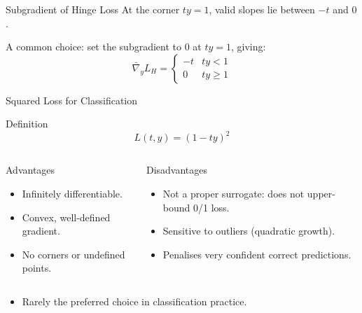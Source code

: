 \begin{frame}{Subgradient of Hinge Loss}
  At the corner $ty=1$, valid slopes lie between $-t$ and $0$.
  \vspace{8pt}
  \begin{center}
  \end{center}
  A common choice: set the subgradient to $0$ at $ty=1$, giving:
  \[
    \bar\nabla_y L_H = \begin{cases} -t & ty<1\\ 0 & ty\geq 1 \end{cases}
  \]
\end{frame}

\begin{frame}{Squared Loss for Classification}
  \begin{block}{Definition}
    \[ L(t,y) = (1-ty)^2 \]
  \end{block}
  \begin{columns}[t]
      \begin{block}{Advantages}
        \begin{itemize}
          \item Infinitely differentiable.
          \item Convex, well-defined gradient.
          \item No corners or undefined points.
        \end{itemize}
      \end{block}
      \begin{alertblock}{Disadvantages}
        \begin{itemize}
          \item Not a proper surrogate: does not upper-bound 0/1 loss.
          \item Sensitive to outliers (quadratic growth).
          \item Penalises very confident correct predictions.
        \end{itemize}
      \end{alertblock}
  \end{columns}
  \vspace{4pt}
  \begin{itemize}
    \item Rarely the preferred choice in classification practice.
  \end{itemize}
\end{frame}

